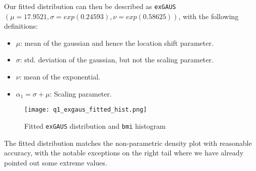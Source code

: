 Our fitted distribution can then be described as \verb|exGAUS|$(\mu=17.9521, \sigma=exp(0.24593), \nu=exp(0.58625))$,
with the following definitions\cite{Rigby:2019}:
\begin{itemize}
\item $\mu$: mean of the gaussian and hence the location shift parameter.
\item $\sigma$: std. deviation of the gaussian, but not the scaling parameter.
\item $\nu$: mean of the exponential.
\item $\alpha_1 = \sigma + \mu$: Scaling parameter.
\end{itemize}


\begin{figure}[H]
  \texttt{[image: q1\_exgaus\_fitted\_hist.png]}
  \caption{Fitted \texttt{exGAUS} distribution and \texttt{bmi} histogram}
\end{figure}

The fitted distribution matches the non-parametric density plot with reasonable accuracy,
with the notable exceptions on the right tail where we have already pointed out some extreme
values.

